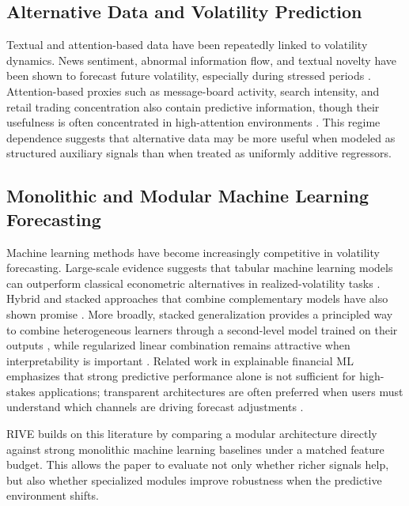 \documentclass[review]{elsarticle}
\begin{document}
\subsection{Alternative Data and Volatility Prediction}\label{alternative-data}

Textual and attention-based data have been repeatedly linked to volatility dynamics. News sentiment, abnormal information flow, and textual novelty have been shown to forecast future volatility, especially during stressed periods \cite{tetlock2007,glasserman2019,bodilsen2025}. Attention-based proxies such as message-board activity, search intensity, and retail trading concentration also contain predictive information, though their usefulness is often concentrated in high-attention environments \cite{antweiler2004,barber2008,da2011,vlastakis2012,audrino2020}. This regime dependence suggests that alternative data may be more useful when modeled as structured auxiliary signals than when treated as uniformly additive regressors.

\subsection{Monolithic and Modular Machine Learning Forecasting}\label{ensemble-expert-systems}

Machine learning methods have become increasingly competitive in volatility forecasting. Large-scale evidence suggests that tabular machine learning models can outperform classical econometric alternatives in realized-volatility tasks \cite{christensen2023}. Hybrid and stacked approaches that combine complementary models have also shown promise \cite{bollerslev2016,ramos2019,selvaraj2025}. More broadly, stacked generalization provides a principled way to combine heterogeneous learners through a second-level model trained on their outputs \cite{wolpert1992}, while regularized linear combination remains attractive when interpretability is important \cite{breiman1996}. Related work in explainable financial ML emphasizes that strong predictive performance alone is not sufficient for high-stakes applications; transparent architectures are often preferred when users must understand which channels are driving forecast adjustments \cite{celik2022}.

RIVE builds on this literature by comparing a modular architecture directly against strong monolithic machine learning baselines under a matched feature budget. This allows the paper to evaluate not only whether richer signals help, but also whether specialized modules improve robustness when the predictive environment shifts.
\end{document}
